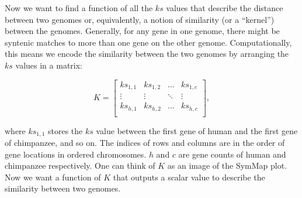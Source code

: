 \documentclass{vgtc}                      %
\begin{document}

Now we want to find a function of all the $ks$ values that describe the distance between two genomes or, equivalently, a notion of similarity (or a ``kernel'') between the genomes.
Generally, for any gene in one genome, there might be syntenic matches to more than one gene on the other genome. Computationally, this means we encode the similarity between the two genomes by arranging the $ks$ values in a matrix:

$$K = 
\begin{bmatrix}
ks_{1,1} & ks_{1,2} & \dots & ks_{1, c}\\
\vdots & \vdots & \ddots & \vdots \\
ks_{h,1} & ks_{h,2} & \dots & ks_{h, c}\\
\end{bmatrix},
$$

\noindent where $ks_{1,1}$ stores the $ks$ value between the first gene of human and the first gene of chimpanzee, and so on. The indices of rows and columns are in the order of gene locations in ordered chromosomes.
$h$ and $c$ are gene counts of human and chimpanzee respectively. One can think of $K$ as an image of the SymMap plot. Now we want a function of $K$ that outputs a scalar value to describe the similarity between two genomes.
\end{document}
